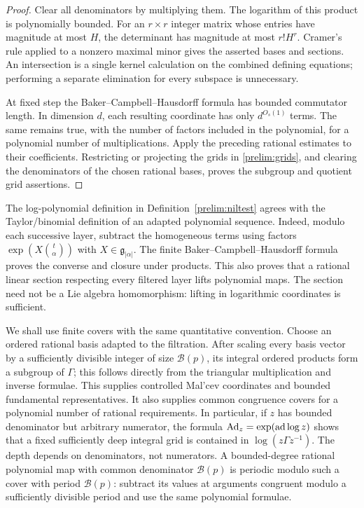 \begin{proof}
Clear all denominators by multiplying them.  The logarithm of this
product is polynomially bounded.  For an $r\times r$ integer matrix
whose entries have magnitude at most $H$, the determinant has magnitude
at most $r!H^r$.  Cramer's rule applied to a nonzero maximal minor gives
the asserted bases and sections.  An intersection is a single kernel
calculation on the combined defining equations; performing a separate
elimination for every subspace is unnecessary.

At fixed step the Baker--Campbell--Hausdorff formula has bounded
commutator length.  In dimension $d$, each resulting coordinate has
only $d^{O_s(1)}$ terms.  The same remains true, with the number of
factors included in the polynomial, for a polynomial number of
multiplications.  Apply the preceding rational estimates to their
coefficients.  Restricting or projecting the grids in
\eqref{prelim:grids}, and clearing the denominators of the chosen
rational bases, proves the subgroup and quotient grid assertions.
\end{proof}

The log-polynomial definition in Definition~\ref{prelim:niltest}
agrees with the Taylor/binomial definition of an adapted polynomial
sequence.  Indeed, modulo each successive layer, subtract the
homogeneous terms using factors
$\exp(X\binom{t}{\alpha})$ with $X\in\mathfrak g_{|\alpha|}$.
The finite Baker--Campbell--Hausdorff formula proves the converse and
closure under products.  This also proves that a rational linear
section respecting every filtered layer lifts polynomial maps.  The
section need not be a Lie algebra homomorphism: lifting in logarithmic
coordinates is sufficient.

We shall use finite covers with the same quantitative convention.
Choose an ordered rational basis adapted to the filtration.  After
scaling every basis vector by a sufficiently divisible integer of size
$\mathcal B(p)$, its integral ordered products form a subgroup of
$\Gamma$; this follows directly from the triangular multiplication
and inverse formulae.  This supplies controlled Mal'cev coordinates
and bounded fundamental representatives.  It also supplies common
congruence covers for a polynomial number of rational requirements.
In particular, if $z$ has bounded denominator but arbitrary numerator,
the formula $\operatorname{Ad}_z=\exp(\operatorname{ad}\log z)$ shows that a fixed
sufficiently deep integral grid is contained in $\log(z\Gamma z^{-1})$.
The depth depends on denominators, not numerators.  A bounded-degree
rational polynomial map with common denominator $\mathcal B(p)$ is
periodic modulo such a cover with period $\mathcal B(p)$: subtract its
values at arguments congruent modulo a sufficiently divisible period
and use the same polynomial formulae.

